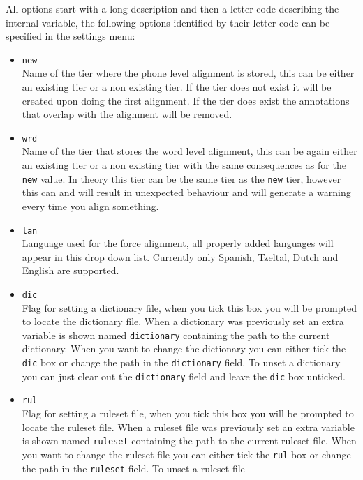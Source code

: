 \documentclass[twoside,a4paper]{book}
\begin{document}
\begin{itemize}
		All options start with a long description and then a letter code
		describing the internal variable, the following options identified by their
		letter code can be specified in the settings menu:
		\begin{itemize}
			\item \texttt{new}\\
				Name of the tier where the phone level alignment is stored, this can be
				either an existing tier or a non existing tier. If the tier does not
				exist it will be created upon doing the first alignment. If the tier
				does exist the annotations that overlap with the alignment will be
				removed.
			\item \texttt{wrd}\\
				Name of the tier that stores the word level alignment, this can be
				again either an existing tier or a non existing tier with the same
				consequences as for the \texttt{new} value. In theory this tier can be
				the same tier as the \texttt{new} tier, however this can and will
				result in unexpected behaviour and will generate a warning every time
				you align something.
			\item \texttt{lan}\\
				Language used for the force alignment, all properly added languages
				will appear in this drop down list. Currently only Spanish, Tzeltal,
				Dutch and English are supported.
			\item \texttt{dic}\\
				Flag for setting a dictionary file, when you tick this box you
				will be prompted to locate the dictionary file. When a dictionary was
				previously set an extra variable is shown named \texttt{dictionary}
				containing the path to the current dictionary. When you want to change
				the dictionary you can either tick the \texttt{dic} box or change the
				path in the \texttt{dictionary} field. To unset a dictionary you can
				just clear out the \texttt{dictionary} field and leave the \texttt{dic}
				box unticked.
			\item \texttt{rul}\\
				Flag for setting a ruleset file, when you tick this box you will be
				prompted to locate the ruleset file. When a ruleset file was
				previously set an extra variable is shown named \texttt{ruleset}
				containing the path to the current ruleset file. When you want to
				change the ruleset file you can either tick the \texttt{rul} box or
				change the path in the \texttt{ruleset} field. To unset a ruleset file

\end{itemize}
\end{itemize}
\end{document}
